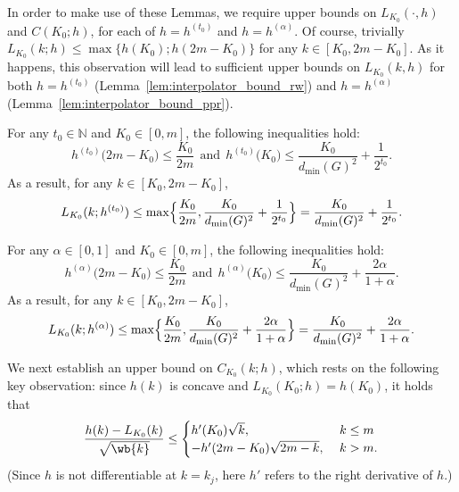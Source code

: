 \documentclass[twoside,11pt]{article}
\newcommand{\1}{\mathbf{1}}
\begin{document}
In order to make use of these Lemmas, we require upper bounds on $L_{K_0}(\cdot,h)$ and $C(K_0;h)$, for each of $h = h^{(t_0)}$ and $h = h^{(\alpha)}$. Of course, trivially $L_{K_0}(k;h) \leq \max\{h(K_0); h(2m - K_0)\}$ for any $k \in [K_0, 2m - K_0]$. As it happens, this observation will lead to sufficient upper bounds on $L_{K_0}(k,h)$ for both $h = h^{(t_0)}$ (Lemma~\ref{lem:interpolator_bound_rw}) and $h = h^{(\alpha)}$ (Lemma~\ref{lem:interpolator_bound_ppr}).  
\begin{lemma}
	\label{lem:interpolator_bound_rw}
	For any $t_0 \in \mathbb{N}$ and $K_0 \in [0,m]$, the following inequalities hold:
	\begin{equation}
	\label{eqn:interpolator_bound_rw}
	h^{(t_0)}\bigl(2m - K_0\bigr) \leq \frac{K_0}{2m}~~\textrm{and}~~h^{(t_0)}\bigl(K_0\bigr) \leq \frac{K_0}{d_{\min}(G)^2} + \frac{1}{2^{t_0}}.
	\end{equation}
	As a result, for any $k \in [K_0, 2m - K_0]$,
	\begin{equation}
	\label{eqn:interpolator_bound_rw_2}
	L_{K_0}(k;h^{(t_0)}) \leq \max\Bigl\{\frac{K_0}{2m}, \frac{K_0}{d_{\min}(G)^2} + \frac{1}{2^{t_0}}\Bigr\} = \frac{K_0}{d_{\min}(G)^2} + \frac{1}{2^{t_0}}.
	\end{equation}
\end{lemma}

\begin{lemma}
	\label{lem:interpolator_bound_ppr}
	For any $\alpha \in [0,1]$ and $K_0 \in [0,m]$, the following inequalities hold:
	\begin{equation}
	\label{eqn:interpolator_bound_ppr}
	h^{(\alpha)}\bigl(2m - K_0\bigr) \leq \frac{K_0}{2m}~~\textrm{and}~~h^{(\alpha)}\bigl(K_0\bigr) \leq \frac{K_0}{d_{\min}(G)^2} + \frac{2\alpha}{1 + \alpha}.
	\end{equation}
	As a result, for any $k \in [K_0, 2m - K_0]$,
	\begin{equation}
	\label{eqn:interpolator_bound_ppr_2}
	L_{K_0}(k;h^{(\alpha)}) \leq \max\Bigl\{\frac{K_0}{2m}, \frac{K_0}{d_{\min}(G)^2} + \frac{2\alpha}{1 + \alpha}\Bigr\} = \frac{K_0}{d_{\min}(G)^2} + \frac{2\alpha}{1 + \alpha}.
	\end{equation}
\end{lemma}

We next establish an upper bound on $C_{K_0}(k;h)$, which rests on the following key observation: since $h(k)$ is concave and $L_{K_0}(K_0;h) = h(K_0)$, it holds that
\begin{equation}
\label{pf:linearization_bound_1}
\frac{h(k) - L_{K_0}(k)}{\sqrt{\wb{k}}} \leq
\begin{cases}
h'(K_0) \sqrt{k},~& k \leq m \\
-h'(2m - K_0) \sqrt{2m - k},~& k > m.
\end{cases}
\end{equation}
(Since $h$ is not differentiable at $k = k_j$, here $h'$ refers to the right derivative of $h$.)  
\end{document}

